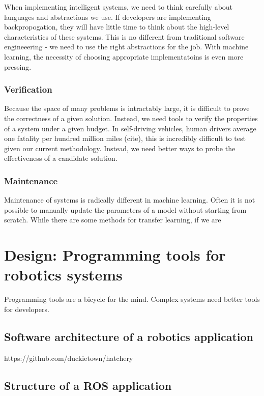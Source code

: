 \documentclass[12pt,initial,twoside,maitrise]{dms}
\numberwithin{equation}{section}
\numberwithin{table}{chapter}
\numberwithin{figure}{chapter}
\begin{document}
When implementing intelligent systems, we need to think carefully about languages and abstractions we use. If developers are implementing backpropogation, they will have little time to think about the high-level characteristics of these systems. This is no different from traditional software engineeering - we need to use the right abstractions for the job. With machine learning, the necessity of choosing appropriate implementatoins is even more pressing.

\subsection{Verification}

Because the space of many problems is intractably large, it is difficult to prove the correctness of a given solution. Instead, we need tools to verify the properties of a system under a given budget. In self-driving vehicles, human drivers average one fatality per hundred million miles (cite), this is incredibly difficult to test given our current methodology. Instead, we need better ways to probe the effectiveness of a candidate solution.

\subsection{Maintenance}

Maintenance of systems is radically different in machine learning. Often it is not possible to manually update the parameters of a model without starting from scratch. While there are some methods for transfer learning, if we are

\chapter{Design: Programming tools for robotics systems}\label{ch:hatchery}

Programming tools are a bicycle for the mind. Complex systems need better tools for developers.

\section{Software architecture of a robotics application}

https://github.com/duckietown/hatchery

\section{Structure of a ROS application}
\end{document}
